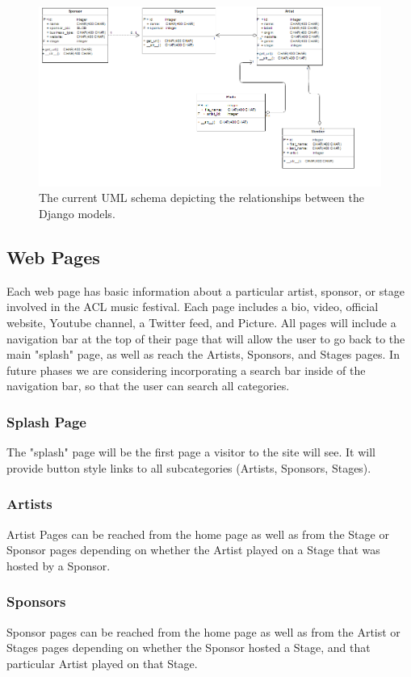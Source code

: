 \documentclass[12pt,english]{scrartcl}
\begin{document}
\begin{figure}[h!]
\includegraphics[width=\textwidth]{UML}
 \caption{The current UML schema depicting the relationships between the Django models.}
\end{figure}

\subsection{Web Pages}
Each web page has basic information about a particular artist, sponsor, or stage involved in the ACL music festival.
Each page includes a bio, video, official website, Youtube channel, a Twitter feed, and Picture. All pages will include a navigation
bar at the top of their page that will allow the user to go back to the main "splash" page, as well as reach the Artists, Sponsors, and
Stages pages. In future phases we are considering incorporating a search bar inside of the navigation bar, so that the user can search
all categories.

\subsubsection{Splash Page}
The "splash" page will be the first page a visitor to the site will see. It will provide button style links to all subcategories (Artists,
Sponsors, Stages).
\subsubsection{Artists}
Artist Pages can be reached from the home page as well as from the Stage or Sponsor pages depending on whether the Artist played on
a Stage that was hosted by a Sponsor.
\subsubsection{Sponsors}
Sponsor pages can be reached from the home page as well as from the Artist or Stages pages depending on whether the Sponsor hosted a
Stage, and that particular Artist played on that Stage.
\end{document}
